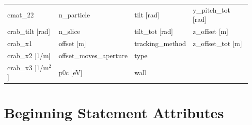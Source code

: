 \begin{tabular}{llll}
cmat_22                          & n_particle                       & tilt [rad]                       & y_pitch_tot [rad]                \\
crab_tilt [rad]                  & n_slice                          & tilt_tot [rad]                   & z_offset [m]                     \\
crab_x1                          & offset [m]                       & tracking_method                  & z_offset_tot [m]                 \\
crab_x2 [1/m]                    & offset_moves_aperture            & type                             &                                  \\
crab_x3 [1/m$^2$]                & p0c [eV]                         & wall                             &                                  \\
 \bottomrule
 \end{tabular}
 \vfill
 
 \section{Beginning Statement Attributes}
 \label{s:list.beginning}
 
